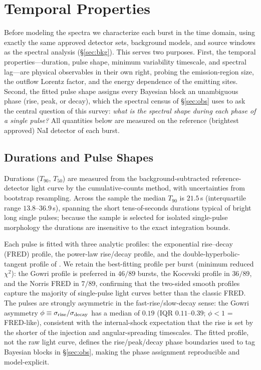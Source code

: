 \section{Temporal Properties} \label{sec:temporal}

Before modeling the spectra we characterize each burst in the time domain,
using exactly the same approved detector sets, background models, and source
windows as the spectral analysis (\S\ref{sec:bkg}). This serves two purposes.
First, the temporal properties---duration, pulse shape, minimum variability
timescale, and spectral lag---are physical observables in their own right,
probing the emission-region size, the outflow Lorentz factor, and the energy
dependence of the emitting sites. Second, the fitted pulse shape assigns every
Bayesian block an unambiguous phase (rise, peak, or decay), which the
spectral census of \S\ref{sec:obs} uses to ask the central question of this
survey: \emph{what is the spectral shape during each phase of a single
pulse?} All quantities below are measured on the reference (brightest
approved) NaI detector of each burst.

\subsection{Durations and Pulse Shapes} \label{sec:durations}

Durations ($T_{90}$, $T_{50}$) are measured from the background-subtracted
reference-detector light curve by the cumulative-counts method, with
uncertainties from bootstrap resampling. Across the sample the median
$T_{90}$ is $21.5$\,s (interquartile range $13.8$--$36.9$\,s), spanning the
short tens-of-seconds durations typical of bright long single pulses; because
the sample is selected for isolated single-pulse morphology the durations are
insensitive to the exact integration bounds.

Each pulse is fitted with three analytic profiles: the \citet{Norris2005}
exponential rise--decay (FRED) profile, the \citet{Kocevski2003} power-law
rise/decay profile, and the double-hyperbolic-tangent profile of
\citet{Gowri2025}. We retain the best-fitting profile per burst (minimum
reduced $\chi^{2}$): the Gowri profile is preferred in $46/89$ bursts, the
Kocevski profile in $36/89$, and the Norris FRED in $7/89$, confirming that
the two-sided smooth profiles capture the majority of single-pulse light
curves better than the classic FRED. The pulses are strongly asymmetric in
the fast-rise/slow-decay sense: the Gowri asymmetry
$\phi \equiv \sigma_{\rm rise}/\sigma_{\rm decay}$ has a median of $0.19$
(IQR $0.11$--$0.39$; $\phi<1$ = FRED-like), consistent with the internal-shock
expectation that the rise is set by the shorter of the injection and
angular-spreading timescales. The fitted profile, not the raw light curve,
defines the rise/peak/decay phase boundaries used to tag Bayesian blocks in
\S\ref{sec:obs}, making the phase assignment reproducible and model-explicit.

